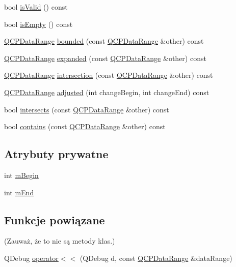 \begin{DoxyCompactItemize}
\item 
bool \hyperlink{class_q_c_p_data_range_a063eeb2c81e86900d974936cbb83f508}{is\+Valid} () const 
\item 
bool \hyperlink{class_q_c_p_data_range_a2ab2e0710dbd4493133ab582ef7e5fc3}{is\+Empty} () const 
\item 
\hyperlink{class_q_c_p_data_range}{Q\+C\+P\+Data\+Range} \hyperlink{class_q_c_p_data_range_a4de1bec5a6e1145bd332d93ac2cc8327}{bounded} (const \hyperlink{class_q_c_p_data_range}{Q\+C\+P\+Data\+Range} \&other) const 
\item 
\hyperlink{class_q_c_p_data_range}{Q\+C\+P\+Data\+Range} \hyperlink{class_q_c_p_data_range_a92eb8e85db62f0f833486fa4521fb586}{expanded} (const \hyperlink{class_q_c_p_data_range}{Q\+C\+P\+Data\+Range} \&other) const 
\item 
\hyperlink{class_q_c_p_data_range}{Q\+C\+P\+Data\+Range} \hyperlink{class_q_c_p_data_range_a2c56cbc35c3beaed34fca1839d570520}{intersection} (const \hyperlink{class_q_c_p_data_range}{Q\+C\+P\+Data\+Range} \&other) const 
\item 
\hyperlink{class_q_c_p_data_range}{Q\+C\+P\+Data\+Range} \hyperlink{class_q_c_p_data_range_a7a7a144cd3df55a6e011b9a84f0f8b69}{adjusted} (int change\+Begin, int change\+End) const 
\item 
bool \hyperlink{class_q_c_p_data_range_afda3603f6ca7cb5c518cdaeea45af267}{intersects} (const \hyperlink{class_q_c_p_data_range}{Q\+C\+P\+Data\+Range} \&other) const 
\item 
bool \hyperlink{class_q_c_p_data_range_a691620b718e4bcefb77bcdde88bd1b34}{contains} (const \hyperlink{class_q_c_p_data_range}{Q\+C\+P\+Data\+Range} \&other) const 
\end{DoxyCompactItemize}
\subsection*{Atrybuty prywatne}
\begin{DoxyCompactItemize}
\item 
int \hyperlink{class_q_c_p_data_range_a849baf613e8ad866a66aaf45682dde53}{m\+Begin}
\item 
int \hyperlink{class_q_c_p_data_range_ac22cfcf2795d5e9f617d788be9fb14a0}{m\+End}
\end{DoxyCompactItemize}
\subsection*{Funkcje powiązane}
(Zauważ, że to nie są metody klas.) \begin{DoxyCompactItemize}
\item 
Q\+Debug \hyperlink{class_q_c_p_data_range_a486dd7af8a090ed069672e3510e6a082}{operator$<$$<$} (Q\+Debug d, const \hyperlink{class_q_c_p_data_range}{Q\+C\+P\+Data\+Range} \&data\+Range)
\end{DoxyCompactItemize}


